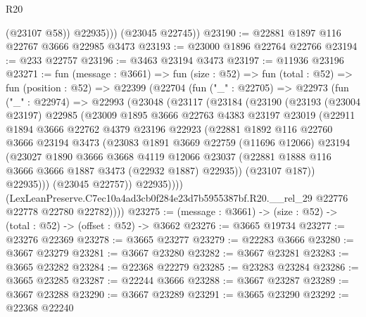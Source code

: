 \begin{lexlean}{R20}
\begin{coremodule}
              (@23107 @58))
            @22935)))
      (@23045 @22745))
@23190 := @22881 @1897 @116 @22767 @3666 @22985 @3473
@23193 := @23000 @1896 @22764 @22766
@23194 := @233 @22757
@23196 := @3463 @23194 @3473
@23197 := @11936 @23196
@23271 := fun (message : @3661) =>
  fun (size : @52) =>
  fun (total : @52) =>
  fun (position : @52) =>
  @22399
    (@22704
      (fun ("_" : @22705) =>
      @22973
        (fun ("_" : @22974) =>
        @22993
          (@23048
            (@23117
              (@23184
                (@23190
                  (@23193
                    (@23004 @23197)
                    @22985
                    (@23009
                      @1895
                      @3666
                      @22763
                      @4383
                      @23197
                      @23019
                      (@22911
                        @1894
                        @3666
                        @22762
                        @4379
                        @23196
                        @22923
                        (@22881
                          @1892
                          @116
                          @22760
                          @3666
                          @23194
                          @3473
                          (@23083
                            @1891
                            @3669
                            @22759
                            (@11696 @12066)
                            @23194
                            (@23027
                              @1890
                              @3666
                              @3668
                              @4119
                              @12066
                              @23037
                              (@22881 @1888 @116 @3666 @3666 @1887 @3473 (@22932 @1887) @22935))
                            (@23107 @187))
                          @22935)))
                    (@23045 @22757))
                  @22935))))
          (LexLeanPreserve.C7ec10a4ad3cb0f284e23d7b5955387bf.R20.__rel_29
            @22776
            @22778
            @22780
            @22782))))
@23275 := (message : @3661) -> (size : @52) -> (total : @52) -> (offset : @52) -> @3662
@23276 := @3665 @19734
@23277 := @23276 @22369
@23278 := @3665 @23277
@23279 := @22283 @3666
@23280 := @3667 @23279
@23281 := @3667 @23280
@23282 := @3667 @23281
@23283 := @3665 @23282
@23284 := @22368 @22279
@23285 := @23283 @23284
@23286 := @3665 @23285
@23287 := @22244 @3666
@23288 := @3667 @23287
@23289 := @3667 @23288
@23290 := @3667 @23289
@23291 := @3665 @23290
@23292 := @22368 @22240

\end{coremodule}
\end{lexlean}
